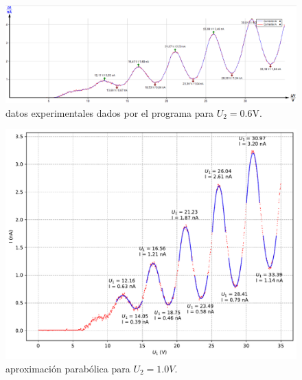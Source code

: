 \documentclass[12pt,a4paper]{article}
\numberwithin{equation}{section}
\numberwithin{figure}{section}
\begin{document}
\begin{figure}[h!]  \centering
\includegraphics[scale=0.5]{0_6-2.png}
\caption{datos experimentales dados por el programa para $U_2=0.6$V.}
\label{Fig:3.31}
\end{figure}
\newpage
\begin{figure}[h!]  \centering
\includegraphics[scale=0.7]{Parabola-4.pdf}
\caption{aproximación parabólica para $U_2=1.0V$.}
\label{Fig:2.4}
\end{figure}
\end{document}
